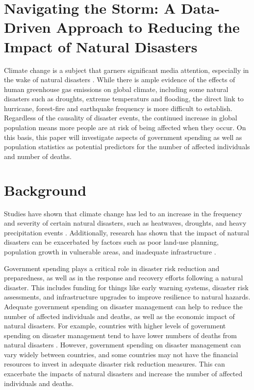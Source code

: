 \documentclass[10pt,a4paper,onecolumn]{article}
\begin{document}
\hypertarget{navigating-the-storm-a-data-driven-approach-to-reducing-the-impact-of-natural-disasters}{%
\section{Navigating the Storm: A Data-Driven Approach to Reducing the Impact of Natural Disasters}\label{navigating-the-storm-a-data-driven-approach-to-reducing-the-impact-of-natural-disasters}}

Climate change is a subject that garners significant media attention, especially in the wake of natural disasters \autocite{comfortIgnoredBannerStory2019,weinerClimateChangeCoverage2021}. While there is ample evidence of the effects of human greenhouse gas emissions on global climate, including some natural disasters such as droughts, extreme temperaturs and flooding, the direct link to hurricane, forest-fire and earthquake frequency is more difficult to establish. Regardless of the causality of disaster events, the continued increase in global population means more people are at risk of being affected when they occur. On this basis, this paper will investigate aspects of government spending as well as population statistics as potential predictors for the number of affected individuals and number of deaths.

\hypertarget{background}{%
\section{Background}\label{background}}

Studies have shown that climate change has led to an increase in the frequency and severity of certain natural disasters, such as heatwaves, droughts, and heavy precipitation events \autocite{alexanderGlobalObservedLongterm2016}. Additionally, research has shown that the impact of natural disasters can be exacerbated by factors such as poor land-use planning, population growth in vulnerable areas, and inadequate infrastructure \autocite{mileti1999disasters,taubenbockQuotLastMileQuot2009}.

Government spending plays a critical role in disaster risk reduction and preparedness, as well as in the response and recovery efforts following a natural disaster. This includes funding for things like early warning systems, disaster risk assessments, and infrastructure upgrades to improve resilience to natural hazards. Adequate government spending on disaster management can help to reduce the number of affected individuals and deaths, as well as the economic impact of natural disasters. For example, countries with higher levels of government spending on disaster management tend to have lower numbers of deaths from natural disasters \autocite{bankoffTimeEssenceDisasters2004,eriksenRethinkingInterplayAffluence2020}. However, government spending on disaster management can vary widely between countries, and some countries may not have the financial resources to invest in adequate disaster risk reduction measures. This can exacerbate the impacts of natural disasters and increase the number of affected individuals and deaths.
\end{document}
